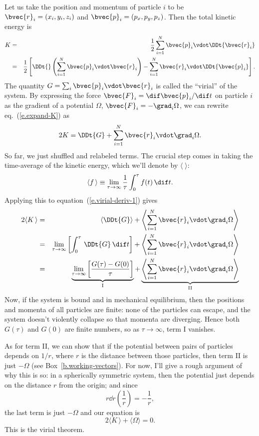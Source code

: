 Let us take the position and momentum of particle $i$ to be $\bvec{r}_{i} = (x_{i},y_{i},z_{i})$ and $\bvec{p}_{i}=(p_{x},p_{y},p_{z})$.  Then the total kinetic energy is
\begin{eqnarray}
\nonumber
	K &=& \frac{1}{2}\sum_{i=1}^{N}\bvec{p}_{i}\vdot\DDt{\bvec{r}_{i}}\\
		&=& \frac{1}{2}\left[\DDt{}\left(\sum_{i=1}^{N}\bvec{p}_{i}\vdot\bvec{r}_{i}\right) - \sum_{i=1}^{N}\bvec{r}_{i}\vdot\DDt{\bvec{p}_{i}}\right].
\label{e.expand-K}
\end{eqnarray}
The quantity $G = \sum_{i}\bvec{p}_{i}\vdot\bvec{r}_{i}$ is called the ``virial'' of the system.  By expressing the force $\bvec{F}_{i} = \dif\bvec{p}_{i}/\dif t$ on particle $i$ as the gradient of a potential $\Omega$, $\bvec{F}_{i} = -\grad_{i}\Omega$, we can rewrite eq.~(\ref{e.expand-K}) as
\begin{equation}\label{e.virial-deriv-1}
	2K = \DDt{G} + \sum_{i=1}^{N}\bvec{r}_{i}\vdot\grad_{i}\Omega.
\end{equation}
So far, we just shuffled and relabeled terms.  The crucial step comes in taking the time-average of the kinetic energy, which we'll denote by $\langle\;\rangle$:
\[	\langle f\,\rangle \equiv \lim_{\tau\to\infty} \frac{1}{\tau}\int_{0}^{\tau}f(t)\,\dif t. \]
Applying this to equation~(\ref{e.virial-deriv-1}) gives
\begin{eqnarray*}
	2\langle K\,\rangle &=&
		 \left\langle\DDt{G}\right\rangle 
		+ \left\langle\sum_{i=1}^{N}\bvec{r}_{i}\vdot\grad_{i}\Omega\right\rangle\\
	&=& \lim_{\tau\to\infty}\left[\int_{0}^{\tau}\,\DDt{G}\,\dif t\right] 
		+ \left\langle\sum_{i=1}^{N}\bvec{r}_{i}\vdot\grad_{i}\Omega\right\rangle\\
	&=& \underbrace{\lim_{\tau\to\infty}\left[\frac{G(\tau)-G(0)}{\tau}\right]}_{\mathrm{I}}
		+ \underbrace{\left\langle\sum_{i=1}^{N}\bvec{r}_{i}\vdot\grad_{i}\Omega\right\rangle}_{\mathrm{II}}
\end{eqnarray*}
Now, if the system is bound and in mechanical equilibrium, then the positions and momenta of all particles are finite: none of the particles can escape, and the system doesn't violently collapse so that momenta are diverging.  Hence both $G(\tau)$ and $G(0)$ are finite numbers, so as $\tau\to\infty$, term I vanishes.

As for term II, we can show that if the potential between pairs of particles depends on $1/r$, where $r$ is the distance between those particles, then term II is just $-\Omega$ (see Box~\ref{b.working-vectors}).  For now, I'll give a rough argument of why this is so:  in a spherically symmetric system, then the potential just depends on the distance $r$ from the origin; and since
\[
	r\dd{}{r} \left(\frac{1}{r}\right) = -\frac{1}{r},
\]
the last term is just $-\Omega$ and our equation is
\begin{equation}\label{e.virial-theorem}
2\langle K\,\rangle + \langle \Omega\rangle = 0.
\end{equation}
This is the virial theorem.

